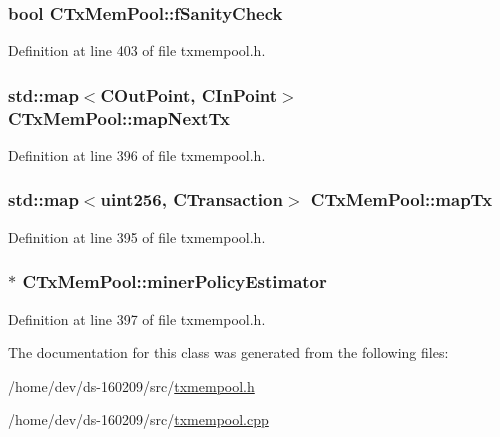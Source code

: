 \subsubsection[{f\+Sanity\+Check}]{\setlength{\rightskip}{0pt plus 5cm}bool C\+Tx\+Mem\+Pool\+::f\+Sanity\+Check}\label{class_c_tx_mem_pool_a1752e79ce537972fe87e252b9d07d2e0}


Definition at line 403 of file txmempool.\+h.

\hypertarget{class_c_tx_mem_pool_aae6f1162f0b2e42b369971f32a9f71e8}{}
\subsubsection[{map\+Next\+Tx}]{\setlength{\rightskip}{0pt plus 5cm}std\+::map$<${\bf C\+Out\+Point}, {\bf C\+In\+Point}$>$ C\+Tx\+Mem\+Pool\+::map\+Next\+Tx}\label{class_c_tx_mem_pool_aae6f1162f0b2e42b369971f32a9f71e8}


Definition at line 396 of file txmempool.\+h.

\hypertarget{class_c_tx_mem_pool_a340d4a897e521b7021e6b22cce951beb}{}
\subsubsection[{map\+Tx}]{\setlength{\rightskip}{0pt plus 5cm}std\+::map$<${\bf uint256}, {\bf C\+Transaction}$>$ C\+Tx\+Mem\+Pool\+::map\+Tx}\label{class_c_tx_mem_pool_a340d4a897e521b7021e6b22cce951beb}


Definition at line 395 of file txmempool.\+h.

\hypertarget{class_c_tx_mem_pool_a435be1fdb4567cd7dd981a49cf633c99}{}
\subsubsection[{miner\+Policy\+Estimator}]{$\ast$ C\+Tx\+Mem\+Pool\+::miner\+Policy\+Estimator}\label{class_c_tx_mem_pool_a435be1fdb4567cd7dd981a49cf633c99}


Definition at line 397 of file txmempool.\+h.



The documentation for this class was generated from the following files\+:\begin{DoxyCompactItemize}
\item 
/home/dev/ds-\/160209/src/\hyperlink{txmempool_8h}{txmempool.\+h}\item 
/home/dev/ds-\/160209/src/\hyperlink{txmempool_8cpp}{txmempool.\+cpp}\end{DoxyCompactItemize}
